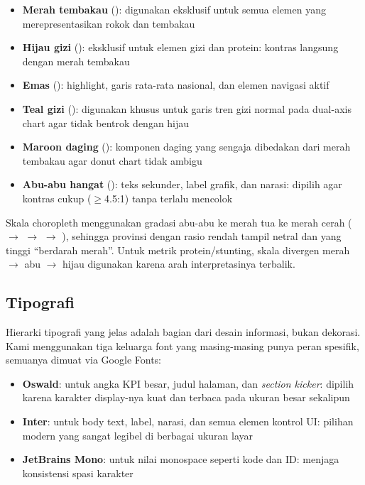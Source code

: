 \begin{itemize}
  \item \textbf{Merah tembakau} (): digunakan eksklusif untuk semua elemen yang merepresentasikan rokok dan tembakau
  \item \textbf{Hijau gizi} (): eksklusif untuk elemen gizi dan protein: kontras langsung dengan merah tembakau
  \item \textbf{Emas} (): highlight, garis rata-rata nasional, dan elemen navigasi aktif
  \item \textbf{Teal gizi} (): digunakan khusus untuk garis tren gizi normal pada dual-axis chart agar tidak bentrok dengan hijau
  \item \textbf{Maroon daging} (): komponen daging yang sengaja dibedakan dari merah tembakau agar donut chart tidak ambigu
  \item \textbf{Abu-abu hangat} (): teks sekunder, label grafik, dan narasi: dipilih agar kontras cukup ($\geq$4.5:1) tanpa terlalu mencolok
\end{itemize}

Skala choropleth menggunakan gradasi abu-abu ke merah tua ke merah cerah ( $\to$  $\to$  $\to$ ), sehingga provinsi dengan rasio rendah tampil netral dan yang tinggi ``berdarah merah''. Untuk metrik protein/stunting, skala divergen merah $\to$ abu $\to$ hijau digunakan karena arah interpretasinya terbalik.

\subsection{Tipografi}

Hierarki tipografi yang jelas adalah bagian dari desain informasi, bukan dekorasi. Kami menggunakan tiga keluarga font yang masing-masing punya peran spesifik, semuanya dimuat via Google Fonts:

\begin{itemize}
  \item \textbf{Oswald}: untuk angka KPI besar, judul halaman, dan \textit{section kicker}: dipilih karena karakter display-nya kuat dan terbaca pada ukuran besar sekalipun
  \item \textbf{Inter}: untuk body text, label, narasi, dan semua elemen kontrol UI: pilihan modern yang sangat legibel di berbagai ukuran layar
  \item \textbf{JetBrains Mono}: untuk nilai monospace seperti kode dan ID: menjaga konsistensi spasi karakter
\end{itemize}

